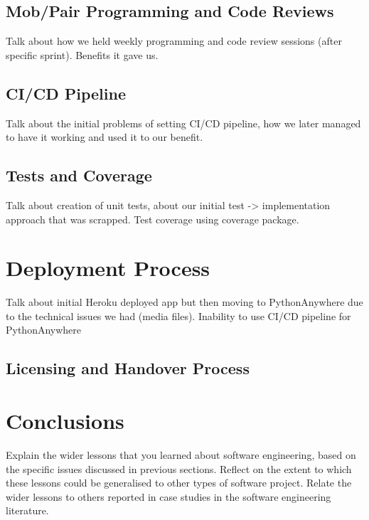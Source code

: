 \documentclass{l3proj}
\begin{document}
    \subsection{Mob/Pair Programming and Code Reviews}
    \label{sec:mob}
        Talk about how we held weekly programming and code review sessions (after specific sprint). Benefits it gave us.
        
    \subsection{CI/CD Pipeline}
    \label{sec:cicd}
        Talk about the initial problems of setting CI/CD pipeline, how we later managed to have it working and used it to our benefit.
        
    \subsection{Tests and Coverage}
    \label{sec:tests}
        Talk about creation of unit tests, about our initial test -> implementation approach that was scrapped. Test coverage using coverage package.




\section{Deployment Process}
\label{sec:deployment}
    Talk about initial Heroku deployed app but then moving to PythonAnywhere due to the technical issues we had (media files). Inability to use CI/CD pipeline for PythonAnywhere
    
    \subsection{Licensing and Handover Process}

\section{Conclusions}

Explain the wider lessons that you learned about software engineering,
based on the specific issues discussed in previous sections.  Reflect
on the extent to which these lessons could be generalised to other
types of software project.  Relate the wider lessons to others
reported in case studies in the software engineering literature.



\end{document}
